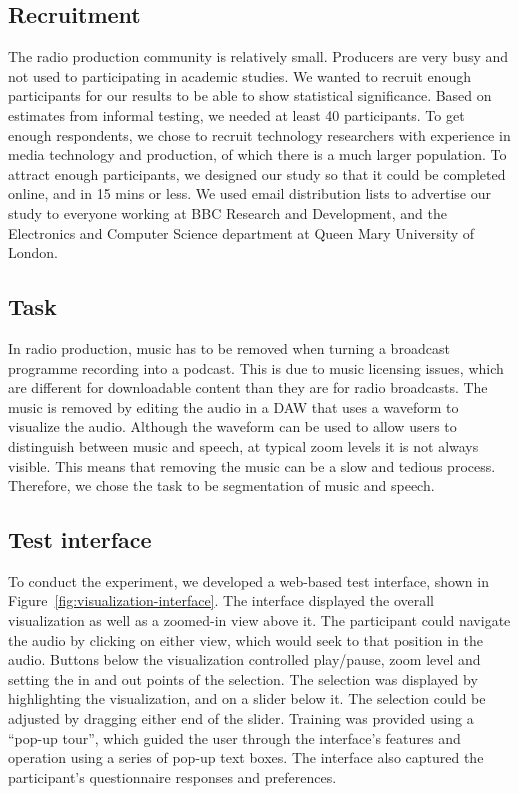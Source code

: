 \subsection{Recruitment}
The radio production community is relatively small. Producers are very busy and not used to participating in academic
studies.  We wanted to recruit enough participants for our results to be able to show statistical significance. Based
on estimates from informal testing, we needed at least 40 participants.  To get enough respondents, we chose to recruit
technology researchers with experience in media technology and production, of which there is a much larger population.
To attract enough participants, we designed our study so that it could be completed online, and in 15 mins or less.  We
used email distribution lists to advertise our study to everyone working at BBC Research and Development, and the
Electronics and Computer Science department at Queen Mary University of London.

\subsection{Task}
In radio production, music has to be removed when turning a broadcast programme recording into a podcast. This is due
to music licensing issues, which are different for downloadable content than they are for radio broadcasts. The music
is removed by editing the audio in a DAW that uses a waveform to visualize the audio. Although the waveform can be
used to allow users to distinguish between music and speech, at typical zoom levels it is not always visible. This
means that removing the music can be a slow and tedious process. Therefore, we chose the task to be segmentation of
music and speech.

\subsection{Test interface}

To conduct the experiment, we developed a web-based test interface, shown in Figure~\ref{fig:visualization-interface}.
The interface displayed the overall visualization as well as a zoomed-in view above it. The participant could navigate
the audio by clicking on either view, which would seek to that position in the audio.  Buttons below the visualization
controlled play/pause, zoom level and setting the in and out points of the selection.  The selection was displayed by
highlighting the visualization, and on a slider below it. The selection could be adjusted by dragging either end of the
slider.  Training was provided using a ``pop-up tour'', which guided the user through the interface's features and
operation using a series of pop-up text boxes.  The interface also captured the participant's questionnaire responses
and preferences.

